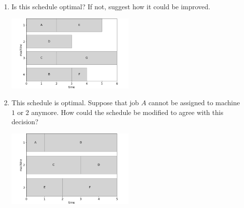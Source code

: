 \documentclass[10pt,a4paper]{article}
\begin{document}
\begin{enumerate}
	\item Is this schedule optimal? If not, suggest how it could be improved.
	\begin{center}
		\includegraphics[width=0.5\textwidth]{figures/makespan_question1}
	\end{center}
	\item This schedule is optimal. Suppose that job $A$ cannot be assigned to machine $1$ or $2$ anymore. How could the schedule be modified to agree with this decision?
	\begin{center}
		\includegraphics[width=0.5\textwidth]{figures/makespan_question2}
	\end{center}
\end{enumerate}
\end{document}
